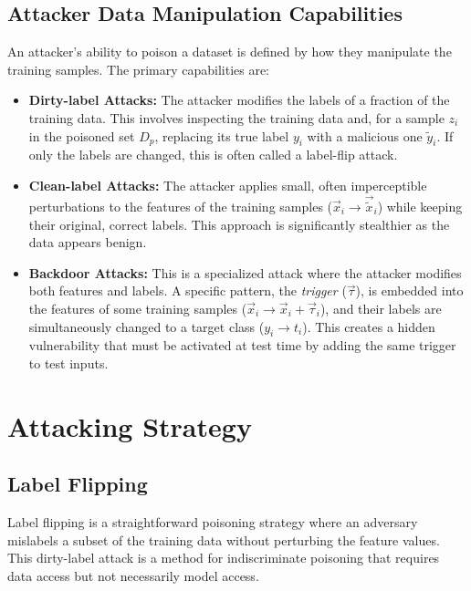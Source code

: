 \documentclass[11pt]{report}
\begin{document}
\subsection{Attacker Data Manipulation Capabilities}
An attacker's ability to poison a dataset is defined by how they manipulate the training samples. The primary capabilities are:

\begin{itemize}
    \item \textbf{Dirty-label Attacks:} The attacker modifies the labels of a fraction of the training data. This involves inspecting the training data and, for a sample $z_i$ in the poisoned set $D_p$, replacing its true label $y_i$ with a malicious one $\tilde{y}_i$. If only the labels are changed, this is often called a label-flip attack.

    \item \textbf{Clean-label Attacks:} The attacker applies small, often imperceptible perturbations to the features of the training samples ($\vec{x}_i \rightarrow \vec{\tilde{x}}_i$) while keeping their original, correct labels. This approach is significantly stealthier as the data appears benign.

    \item \textbf{Backdoor Attacks:} This is a specialized attack where the attacker modifies both features and labels. A specific pattern, the \emph{trigger} ($\vec{\tau}$), is embedded into the features of some training samples ($\vec{x}_i \rightarrow \vec{x}_i + \vec{\tau}_i$), and their labels are simultaneously changed to a target class ($y_i \rightarrow t_i$). This creates a hidden vulnerability that must be activated at test time by adding the same trigger to test inputs.
\end{itemize}
\section{Attacking Strategy}
\subsection{Label Flipping}

Label flipping is a straightforward poisoning strategy where an adversary mislabels a subset of the training data without perturbing the feature values. This dirty-label attack is a method for indiscriminate poisoning that requires data access but not necessarily model access.

\vspace{1em} %
\end{document}
